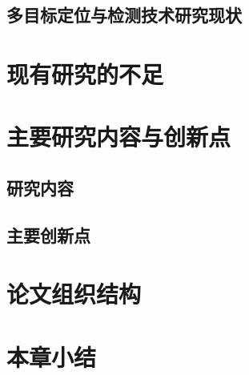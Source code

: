 
\subsection{多目标定位与检测技术研究现状}


\section{现有研究的不足}


\section{主要研究内容与创新点}

\subsection{研究内容}


\subsection{主要创新点}


\section{论文组织结构}


\section{本章小结}

